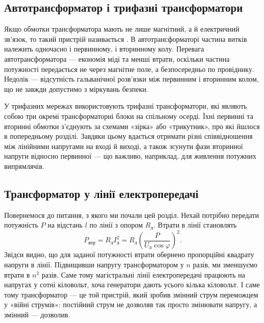 \subsection*{Автотрансформатор і трифазні трансформатори}

Якщо обмотки трансформатора мають не лише магнітний, а й
електричний зв'язок, то такий пристрій називається
. В автотрансформаторі частина
витків належить одночасно і первинному, і вторинному колу.
Перевага автотрансформатора --- економія міді та менші втрати,
оскільки частина потужності передається не через магнітне поле,
а безпосередньо по провіднику. Недолік --- відсутність
гальванічної розв'язки між первинним і вторинним колом, що не
завжди допустимо з міркувань безпеки.

У трифазних мережах використовують трифазні трансформатори, які
являють собою три окремі трансформаторні блоки на спільному
осерді. Їхні первинні та вторинні обмотки з'єднують за схемами
«зірка» або «трикутник», про які йшлося в попередньому розділі.
Завдяки цьому вдається отримати різні співвідношення між
лінійними напругами на вході й виході, а також зсунути фази
вторинної напруги відносно первинної --- що важливо, наприклад,
для живлення потужних випрямлячів.

\subsection*{Трансформатор у лінії електропередачі}

Повернемося до питання, з якого ми почали цей розділ. Нехай
потрібно передати потужність $P$ на відстань $l$ по лінії з
опором $R_{\text{л}}$. Втрати в лінії становлять
\begin{equation}\label{eq:line_losses_transformer}
	P_{\text{втр}} = R_{\text{л}} I_{\text{л}}^2
	                = R_{\text{л}} \left(\frac{P}{U_{\text{л}}\cos\varphi}\right)^2.
\end{equation}
Звідси видно, що для заданої потужності втрати обернено
пропорційні квадрату напруги в лінії. Підвищивши напругу
трансформатором у $n$ разів, ми зменшуємо втрати в $n^2$ разів.
Саме тому магістральні лінії електропередачі працюють на
напругах у сотні кіловольт, хоча генератори дають усього
кілька кіловольт. І саме тому трансформатор --- це той пристрій,
який зробив змінний струм переможцем у «війні струмів»:
постійний струм не дозволяв так просто змінювати напругу, а
змінний --- дозволив.

